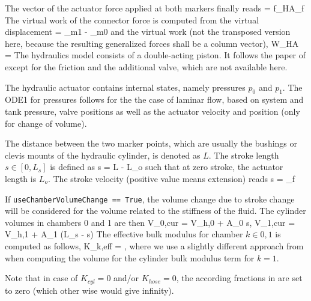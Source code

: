     The vector of the actuator force applied at both markers finally reads
    \be
      \fv = f_{HA}\vv_{f}
    \ee
    The virtual work of the connector force is computed from the virtual displacement 
    \be
      \delta \Delta\!  = \delta {}_{m1} - \delta {}_{m0} \eqComma
    \ee
    and the virtual work (not the transposed version here, because the resulting generalized forces shall be a column vector),
    \be
      \delta W_{HA} = \fv \delta \Delta\!  
      \eqDot
    \ee    
    The hydraulics model consists of a double-acting piston. It follows the paper of \cite{RahikainenGonzalezNayaEtAl2020} 
    except for the friction and the additional valve, which are not available here.
    
    The hydraulic actuator contains internal states, namely pressures $p_0$ and $p_1$.
    The \ac{ODE1} for pressures follows for the the case of laminar flow, based on system and tank pressure,
    valve positions as well as the actuator velocity and position (only for change of volume).
    
    The distance between the two marker points, which are usually the bushings or clevis mounts of the hydraulic cylinder, is
    denoted as $L$. The stroke length $s \in [0, L_s]$ is defined as
    \be
      s = L - L_o
    \ee
    such that at zero stroke, the actuator length is $L_o$. The stroke velocity (positive value means extension) reads
    \be
      \dot s = \Delta\!  \vv_{f}
    \ee
    
    If \texttt{useChamberVolumeChange == True}, the volume change due to stroke change will be considered for the
    volume related to the stiffness of the fluid.
    The cylinder volumes in chambers 0 and 1 are then
    \be
      V_{0,cur} = V_{h,0} + A_0 \cdot s, \quad
      V_{1,cur} = V_{h,1} + A_1 \cdot (L_s - s)
    \ee
    The effective bulk modulus for chamber $k \in {0,1}$ is computed as follows,
    \be \label{eq:hydraulicActuator:effBulkModulus}
      K_{k,eff} = ,
    \ee
    where we use a slightly different approach from \cite{RahikainenGonzalezNayaEtAl2020} when computing the volume for the cylinder bulk modulus term for $k=1$.
    
    Note that in case of $K_{cyl}=0$ and/or $K_{hose}=0$, the according fractions in   
    are set to zero (which other wise would give infinity).

